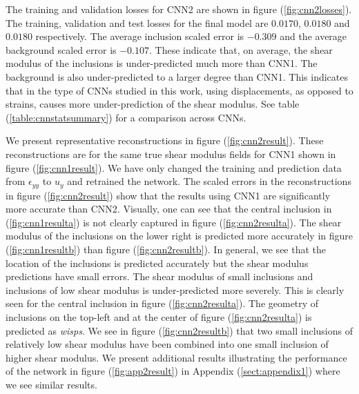 \documentclass[12pt]{article}
\begin{document}
The training and validation losses for CNN2 are shown in figure (\ref{fig:cnn2losses}). The training, validation and test losses for the final model are $0.0170$, $0.0180$ and $0.0180$ respectively. The average inclusion scaled error is $-0.309$ and the average background scaled error is $-0.107$. These indicate that, on average, the shear modulus of the inclusions is under-predicted much more than CNN1. The background is also under-predicted to a larger degree than CNN1. This indicates that in the type of CNNs studied in this work, using displacements, as opposed to strains, causes more under-prediction of the shear modulus. See table (\ref{table:cnnstatsummary}) for a comparison across CNNs.

We present representative reconstructions in figure (\ref{fig:cnn2result}). These reconstructions are for the same true shear modulus fields for CNN1 shown in figure (\ref{fig:cnn1result}). We have only changed the training and prediction data from $\epsilon_{yy}$ to $u_{y}$ and retrained the network. The scaled errors in the reconstructions in figure (\ref{fig:cnn2result}) show that the results using CNN1 are significantly more accurate than CNN2. Visually, one can see that the central inclusion in (\ref{fig:cnn1resulta}) is not clearly captured in figure (\ref{fig:cnn2resulta}). The shear modulus of the inclusions on the lower right is predicted more accurately in figure (\ref{fig:cnn1resultb}) than figure (\ref{fig:cnn2resultb}). In general, we see that the location of the inclusions is predicted accurately but the shear modulus predictions have small errors. The shear modulus of small inclusions and inclusions of low shear modulus is under-predicted more severely. This is clearly seen for the central inclusion in figure (\ref{fig:cnn2resulta}). The geometry of inclusions on the top-left and at the center of figure (\ref{fig:cnn2resulta}) is predicted as \textit{wisps}. We see in figure (\ref{fig:cnn2resultb}) that two small inclusions of relatively low shear modulus have been combined into one small inclusion of higher shear modulus. We present additional results illustrating the performance of the network in figure (\ref{fig:app2result}) in Appendix (\ref{sect:appendix1}) where we see similar results.
\end{document}
